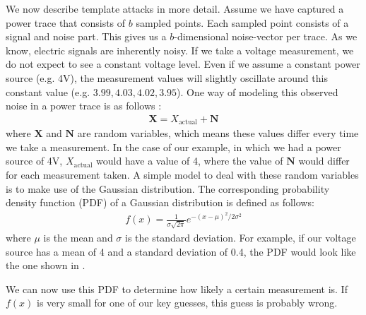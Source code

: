 %
We now describe template attacks in more detail.
Assume we have captured a power trace that consists of $b$ sampled points. 
Each sampled point consists of a signal and noise part. 
This gives us a $b$-dimensional noise-vector per trace.
As we know, electric signals are inherently noisy. 
If we take a voltage measurement, we do not expect to see a constant voltage level.
Even if we assume a constant power source (e.g. 4V), the measurement values will slightly oscillate around this constant value (e.g. $3.99, 4.03, 4.02, 3.95$).
One way of modeling this observed noise in a power trace is as follows \cite{whisperer2018template}:
%
\begin{align*}
\bm{X} = X_\text{actual} + \bm{N}
\end{align*}
% 
where $\bm{X}$ and $\bm{N}$ are random variables, which means these values differ every time we take a measurement.
In the case of our example, in which we had a power source of 4V, $X_\text{actual}$ would have a value of 4, where the value of $\bm{N}$ would differ for each measurement taken.
A simple model to deal with these random variables is to make use of the Gaussian distribution. 
The corresponding probability density function (PDF) of a Gaussian distribution is defined as follows:
%
\begin{align*}
f(x) = \frac{1}{\sigma \sqrt{2\pi}} e^{ -(x - \mu)^2 / 2 \sigma^2 }
\end{align*}
%
where $\mu$ is the mean and $\sigma$ is the standard deviation.
For example, if our voltage source has a mean of 4 and a standard deviation of 0.4, the PDF would look like the one shown in .
%
\begin{figure}
	\centering
	\label{fig: normal Gaussian example}
\end{figure}
%
We can now use this PDF to determine how likely a certain measurement is. 
If $f(x)$ is very small for one of our key guesses, this guess is probably wrong.

